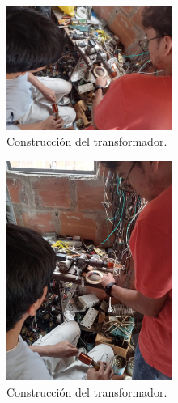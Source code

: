 \begin{figure}[ht!]
    \centering
    \includegraphics[width=0.48\textwidth]{fot/TA5.jpeg}
    \caption{Construcción del transformador.}
    \label{fig:TA5}
\end{figure}

\begin{figure}[ht!]
    \centering
    \includegraphics[width=0.48\textwidth]{fot/TA6.jpeg}
    \caption{Construcción del transformador.}
    \label{fig:TA6}
\end{figure}
